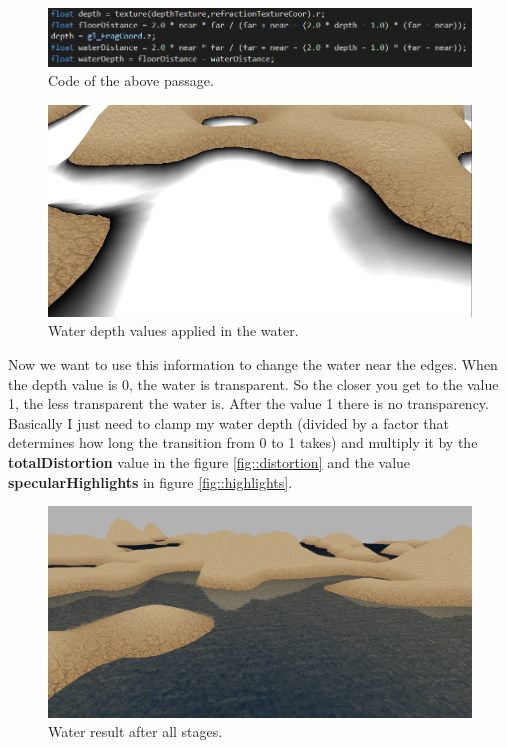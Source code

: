 \begin{figure}[hbt!]
	\centering
	\includegraphics[width= 1
	\textwidth]{images/Water8.png}
	\caption{Code of the above passage.}
\end{figure} 

\begin{figure}[hbt!]
	\centering
	\includegraphics[width= 1
	\textwidth]{images/Water9.png}
	\caption{Water depth values applied in the water.}
\end{figure}

\noindent
Now we want to use this information to change the water near the edges. When the depth value is 0, the water is transparent. So the closer you get to the value 1, the less transparent the water is. After the value 1 there is no transparency.
Basically I just need to clamp my water depth (divided by a factor that determines how long the transition from 0 to 1 takes) and multiply it by the \textbf{totalDistortion} value in the figure \ref {fig::distortion} and the value \textbf{specularHighlights} in figure \ref {fig::highlights}.

\newpage

\begin{figure}[hbt!]
	\centering
	\includegraphics[width= 1
	\textwidth]{images/Water10.png}
	\caption{Water result after all stages.}
\end{figure}

